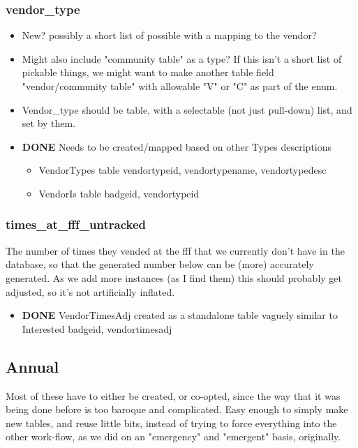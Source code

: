 \documentclass[captions=tablesignature]{scrartcl}
\begin{document}
\subsubsection{vendor\_type}
\label{sec-2-1-17}
\begin{itemize}
\item New? possibly a short list of possible with a mapping to the
vendor?
\item Might also include "community table" as a type?  If this isn't a
short list of pickable things, we might want to make another
table field "vendor/community table" with allowable "V" or "C"
as part of the enum.
\item Vendor\_type should be table, with a selectable (not just pull-down)
list, and set by them.
\end{itemize}
\begin{itemize}
\item {\bfseries\sffamily DONE} Needs to be created/mapped based on other Types descriptions
\label{sec-2-1-17-1}
\begin{itemize}
\item VendorTypes table vendortypeid, vendortypename, vendortypedesc
\item VendorIs table badgeid, vendortypeid
\end{itemize}
\end{itemize}

\subsubsection{times\_at\_fff\_untracked}
\label{sec-2-1-18}
The number of times they vended at the fff that we currently don't
have in the database, so that the generated number below can be
(more) accurately generated.  As we add more instances (as I find
them) this should probably get adjusted, so it's not artificially
inflated. 
\begin{itemize}
\item {\bfseries\sffamily DONE} VendorTimesAdj created as a standalone table vaguely similar to Interested
\label{sec-2-1-18-1}
badgeid, vendortimesadj
\end{itemize}

\subsection{Annual}
\label{sec-2-2}
Most of these have to either be created, or co-opted, since the way
that it was being done before is too baroque and complicated.  Easy
enough to simply make new tables, and reuse little bits, instead
of trying to force everything into the other work-flow, as we did on
an "emergency" and "emergent" basis, originally.
\end{document}
